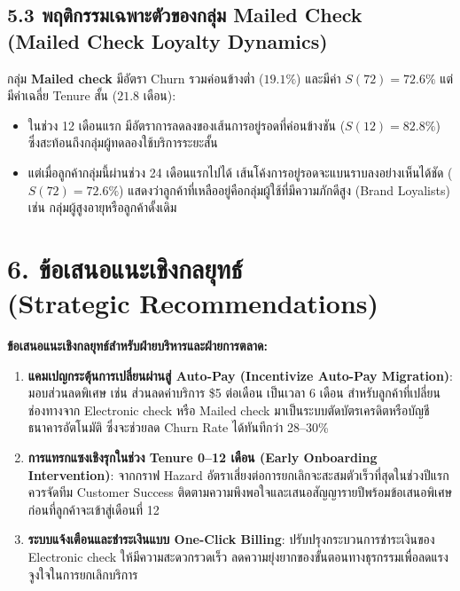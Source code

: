 \documentclass[12pt,a4paper]{article}
\begin{document}
\subsection*{5.3 พฤติกรรมเฉพาะตัวของกลุ่ม Mailed Check\\ \normalsize(Mailed Check Loyalty Dynamics)}
กลุ่ม \textbf{Mailed check} มีอัตรา Churn รวมค่อนข้างต่ำ ($19.1\%$) และมีค่า $S(72) = 72.6\%$ แต่มีค่าเฉลี่ย Tenure สั้น ($21.8$ เดือน):
\begin{itemize}[leftmargin=18pt, itemsep=2pt]
    \item ในช่วง 12 เดือนแรก มีอัตราการลดลงของเส้นการอยู่รอดที่ค่อนข้างชัน ($S(12) = 82.8\%$) ซึ่งสะท้อนถึงกลุ่มผู้ทดลองใช้บริการระยะสั้น
    \item แต่เมื่อลูกค้ากลุ่มนี้ผ่านช่วง 24 เดือนแรกไปได้ เส้นโค้งการอยู่รอดจะแบนราบลงอย่างเห็นได้ชัด ($S(72) = 72.6\%$) แสดงว่าลูกค้าที่เหลืออยู่คือกลุ่มผู้ใช้ที่มีความภักดีสูง (Brand Loyalists) เช่น กลุ่มผู้สูงอายุหรือลูกค้าดั้งเดิม
\end{itemize}

\section*{6. ข้อเสนอแนะเชิงกลยุทธ์\\ \large(Strategic Recommendations)}

\begin{ansbox}
\textbf{ข้อเสนอแนะเชิงกลยุทธ์สำหรับฝ่ายบริหารและฝ่ายการตลาด:}
\begin{enumerate}[leftmargin=16pt, itemsep=2pt]
    \item \textbf{แคมเปญกระตุ้นการเปลี่ยนผ่านสู่ Auto-Pay (Incentivize Auto-Pay Migration)}: มอบส่วนลดพิเศษ เช่น ส่วนลดค่าบริการ \$5 ต่อเดือน เป็นเวลา 6 เดือน สำหรับลูกค้าที่เปลี่ยนช่องทางจาก Electronic check หรือ Mailed check มาเป็นระบบตัดบัตรเครดิตหรือบัญชีธนาคารอัตโนมัติ ซึ่งจะช่วยลด Churn Rate ได้ทันทีกว่า 28--30\%
    \item \textbf{การแทรกแซงเชิงรุกในช่วง Tenure 0--12 เดือน (Early Onboarding Intervention)}: จากกราฟ Hazard อัตราเสี่ยงต่อการยกเลิกจะสะสมตัวเร็วที่สุดในช่วงปีแรก ควรจัดทีม Customer Success ติดตามความพึงพอใจและเสนอสัญญารายปีพร้อมข้อเสนอพิเศษก่อนที่ลูกค้าจะเข้าสู่เดือนที่ 12
    \item \textbf{ระบบแจ้งเตือนและชำระเงินแบบ One-Click Billing}: ปรับปรุงกระบวนการชำระเงินของ Electronic check ให้มีความสะดวกรวดเร็ว ลดความยุ่งยากของขั้นตอนทางธุรกรรมเพื่อลดแรงจูงใจในการยกเลิกบริการ
\end{enumerate}
\end{ansbox}
\end{document}
